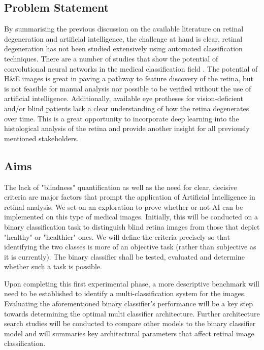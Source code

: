 \documentclass[a4paper]{article}
\begin{document}
    \subsection{Problem Statement}
        By summarising the previous discussion on the available literature on retinal degeneration and artificial intelligence, the challenge at hand is clear, retinal degeneration has not been studied extensively using automated classification techniques. There are a number of studies that show the potential of convolutional neural networks in the medical classification field \cite{RN6}\cite{RN13}\cite{RN15}\cite{RN16}\cite{RN14}. The potential of H\&E images is great in paving a pathway to feature discovery of the retina, but is not feasible for manual analysis nor possible to be verified without the use of artificial intelligence. Additionally, available eye protheses for vision-deficient and/or blind patients lack a clear understanding of how the retina degenerates over time. This is a great opportunity to incorporate deep learning into the histological analysis of the retina and provide another insight for all previously mentioned stakeholders.

    \subsection{Aims}
        The lack of "blindness" quantification as well as the need for clear, decisive criteria are major factors that prompt the application of Artificial Intelligence in retinal analysis. We set on an exploration to prove whether or not AI can be implemented on this type of medical images. Initially, this will be conducted on a binary classification task to distinguish blind retina images from those that depict "healthy" or "healthier" ones. We will define the criteria precisely so that identifying the two classes is more of an objective task (rather than subjective as it is currently). The binary classifier shall be tested, evaluated and determine whether such a task is possible.
        \vspace{3mm}
        
        Upon completing this first experimental phase, a more descriptive benchmark will need to be established to identify a multi-classification system for the images. Evaluating the aforementioned binary classifier's performance will be a key step towards determining the optimal multi classifier architecture. Further architecture search studies will be conducted to compare other models to the binary classifier model and will summaries key architectural parameters that affect retinal image classification.  
        \vspace{3mm}
        
\end{document}

